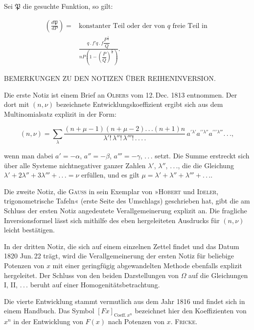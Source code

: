 \noindent\hspace*{\parindent}Sei $\mathfrak{P}$ die gesuchte Funktion, so gilt:

\[
\begin{aligned}\left(\frac{d\mathfrak{P}}{dP}\right) ={}& \text{konstanter Teil oder der von } q \text{ freie Teil in }\\ &\frac{q\,.\,f'q\,.\,f\dfrac{P^{\frac1n}}{Q}}{nP\left(1-\left(\dfrac{P}{Q}\right)^{\frac{\nu}{n}}\right)}.
\end{aligned}
\]



\begin{center}
BEMERKUNGEN ZU DEN NOTIZEN ÜBER REIHENINVERSION.
\end{center}

\noindent\hspace*{\parindent}Die erste Notiz ist einem Brief an \textsc{Olbers} vom 12.\,Dec. 1813 entnommen. Der dort mit $(n,\nu)$ bezeichnete Entwicklungskoeffizient ergibt sich aus dem Multinomialsatz explizit in der Form:

\[
(n,\nu) = \sum_\lambda \frac{(n+\mu-1)(n+\mu-2).\,.\,.(n+1)n}{\lambda'!\,\lambda''!\,\lambda'''!\,.\,.\,.\,.}\, a^{\prime\lambda'}a^{\prime\prime\lambda''}a^{\prime\prime\prime\lambda'''}.\,.\,.,
\]

\noindent wenn man dabei $a'=-\alpha$, $a''=-\beta$, $a'''=-\gamma$, .\,.\,. setzt. Die Summe erstreckt sich über alle Systeme nichtnegativer ganzer Zahlen $\lambda'$, $\lambda''$, .\,.\,., die die Gleichung $\lambda'+2\lambda''+3\lambda'''+.\,.\,.=\nu$ erfüllen, und es gilt $\mu=\lambda'+\lambda''+\lambda'''+.\,.\,.$.

Die zweite Notiz, die \textsc{Gauss} in sein Exemplar von »\textsc{Hobert} und \textsc{Ideler}, trigonometrische Tafeln« (erste Seite des Umschlags) geschrieben hat, gibt die am Schluss der ersten Notiz angedeutete Verallgemeinerung explizit an. Die fragliche Inversionsformel lässt sich mithilfe des eben hergeleiteten Ausdrucks für $(n,\nu)$ leicht bestätigen.

In der dritten Notiz, die sich auf einem einzelnen Zettel findet und das Datum 1820 Jun.\,22 trägt, wird die Verallgemeinerung der ersten Notiz für beliebige Potenzen von $x$ mit einer geringfügig abgewandelten Methode ebenfalls explizit hergeleitet. Der Schluss von den beiden Darstellungen von $\Omega$ auf die Gleichungen I, II, .\,.\,. beruht auf einer Homogenitätsbetrachtung.

Die vierte Entwicklung stammt vermutlich aus dem Jahr 1816 und findet sich in einem Handbuch. Das Symbol $[Fx]_{\text{Coeff.}\,x^n}$ bezeichnet hier den Koeffizienten von $x^n$ in der Entwicklung von $F(x)$ nach Potenzen von $x$. \hfill\textsc{Fricke.}

